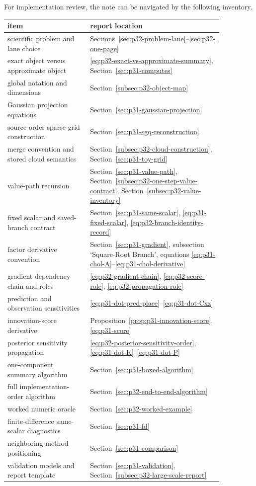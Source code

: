 \documentclass[11pt]{article}
\numberwithin{equation}{section}
\begin{document}
For implementation review, the note can be navigated by the following inventory.
\begin{center}
\small
\begin{tabular}{p{0.33\linewidth}p{0.53\linewidth}}
\toprule
item & report location \\
\midrule
scientific problem and lane choice & Sections~\ref{sec:p32-problem-lane}--\ref{sec:p32-one-page} \\
exact object versus approximate object & \eqref{eq:p32-exact-vs-approximate-summary}, Section~\ref{sec:p31-computes} \\
global notation and dimensions & Section~\ref{subsec:p32-object-map} \\
Gaussian projection equations & Section~\ref{sec:p31-gaussian-projection} \\
source-order sparse-grid construction & Section~\ref{sec:p31-sgq-reconstruction} \\
merge convention and stored cloud semantics & Section~\ref{subsec:p32-cloud-construction}, Section~\ref{sec:p31-toy-grid} \\
value-path recursion & Section~\ref{sec:p31-value-path}, Section~\ref{subsec:p32-one-step-value-contract}, Section~\ref{subsec:p32-value-inventory} \\
fixed scalar and saved-branch contract & Section~\ref{sec:p31-same-scalar}, \eqref{eq:p31-fixed-scalar}, \eqref{eq:p32-branch-identity-record} \\
factor derivative convention & Section~\ref{sec:p31-gradient}, subsection `Square-Root Branch', equations \eqref{eq:p31-chol-A}--\eqref{eq:p31-chol-derivative} \\
gradient dependency chain and roles & \eqref{eq:p32-gradient-chain}, \eqref{eq:p32-score-role}, \eqref{eq:p32-propagation-role} \\
prediction and observation sensitivities & \eqref{eq:p31-dot-pred-place}--\eqref{eq:p31-dot-Cxz} \\
innovation-score derivative & Proposition~\ref{prop:p31-innovation-score}, \eqref{eq:p31-score} \\
posterior sensitivity propagation & \eqref{eq:p32-posterior-sensitivity-order}, \eqref{eq:p31-dot-K}--\eqref{eq:p31-dot-P} \\
one-component summary algorithm & Section~\ref{sec:p31-boxed-algorithm} \\
full implementation-order algorithm & Section~\ref{sec:p32-end-to-end-algorithm} \\
worked numeric oracle & Section~\ref{sec:p32-worked-example} \\
finite-difference same-scalar diagnostics & Section~\ref{sec:p31-fd} \\
neighboring-method positioning & Section~\ref{sec:p31-comparison} \\
validation models and report template & Section~\ref{sec:p31-validation}, Section~\ref{subsec:p32-large-scale-report} \\
\bottomrule
\end{tabular}
\end{center}




\end{document}
